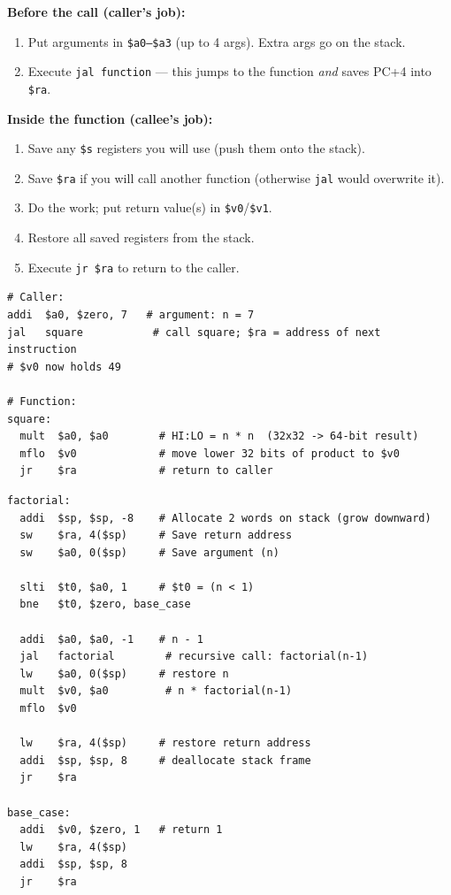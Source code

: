 \documentclass[11pt, letterpaper]{article}
\begin{document}
\begin{tcolorbox}[colback=partbg, colframe=sectionblue,
  title={\bfseries The Standard MIPS Call Convention}, arc=3pt, boxrule=1pt]
\textbf{Before the call (caller's job):}
\begin{enumerate}[noitemsep, leftmargin=*]
  \item Put arguments in \texttt{\$a0--\$a3} (up to 4 args). Extra args go on the stack.
  \item Execute \texttt{jal function} --- this jumps to the function \emph{and} saves PC+4 into \texttt{\$ra}.
\end{enumerate}
\textbf{Inside the function (callee's job):}
\begin{enumerate}[noitemsep, leftmargin=*]
  \item Save any \texttt{\$s} registers you will use (push them onto the stack).
  \item Save \texttt{\$ra} if you will call another function (otherwise \texttt{jal} would overwrite it).
  \item Do the work; put return value(s) in \texttt{\$v0}/\texttt{\$v1}.
  \item Restore all saved registers from the stack.
  \item Execute \texttt{jr \$ra} to return to the caller.
\end{enumerate}
\end{tcolorbox}

\begin{lstlisting}[style=mips, caption={Complete function example: int square(int n) \{ return n*n; \}}]
# Caller:
addi  $a0, $zero, 7   # argument: n = 7
jal   square           # call square; $ra = address of next instruction
# $v0 now holds 49

# Function:
square:
  mult  $a0, $a0        # HI:LO = n * n  (32x32 -> 64-bit result)
  mflo  $v0             # move lower 32 bits of product to $v0
  jr    $ra             # return to caller
\end{lstlisting}

\begin{lstlisting}[style=mips, caption={Stack frame example for a function that calls another function}]
factorial:
  addi  $sp, $sp, -8    # Allocate 2 words on stack (grow downward)
  sw    $ra, 4($sp)     # Save return address
  sw    $a0, 0($sp)     # Save argument (n)

  slti  $t0, $a0, 1     # $t0 = (n < 1)
  bne   $t0, $zero, base_case

  addi  $a0, $a0, -1    # n - 1
  jal   factorial        # recursive call: factorial(n-1)
  lw    $a0, 0($sp)     # restore n
  mult  $v0, $a0         # n * factorial(n-1)
  mflo  $v0

  lw    $ra, 4($sp)     # restore return address
  addi  $sp, $sp, 8     # deallocate stack frame
  jr    $ra

base_case:
  addi  $v0, $zero, 1   # return 1
  lw    $ra, 4($sp)
  addi  $sp, $sp, 8
  jr    $ra
\end{lstlisting}
\end{document}
